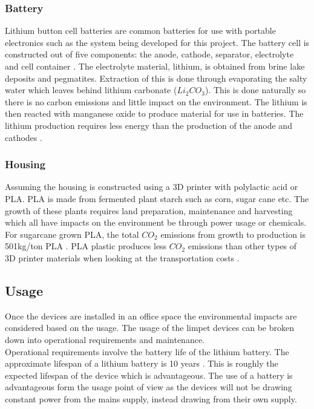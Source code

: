 \documentclass[12pt, a4paper]{article}
\begin{document}
\subsubsection{Battery}
Lithium button cell batteries are common batteries for use with portable electronics such as the system being developed for this project. The battery cell is constructed out of five components: the anode, cathode, separator, electrolyte and cell container \cite{BATTLCA_1}. The electrolyte material, lithium, is obtained from brine lake deposits and pegmatites.  Extraction of this is done through evaporating the salty water which leaves behind lithium carbonate ($Li_2CO_3$). This is done naturally so there is no carbon emissions and little impact on the environment. The lithium is then reacted with manganese oxide to produce material for use in batteries. The lithium production requires less energy than the production of the anode and cathodes \cite{BATTLCA_2}.
\subsubsection{Housing}
Assuming the housing is constructed using a 3D printer with polylactic acid or PLA. PLA is made from fermented plant starch such as corn, sugar cane etc. The growth of these plants requires land preparation, maintenance and harvesting which all have impacts on the environment be through power usage or chemicals. For sugarcane grown PLA, the total $CO_2$ emissions from growth to production is 501kg/ton PLA \cite{PLALCA_1}. PLA plastic produces less $CO_2$ emissions than other types of 3D printer materials when looking at the transportation costs \cite{PLALCA_2}.
\subsection{Usage}
Once the devices are installed in an office space the environmental impacts are considered based on the usage. The usage of the limpet devices can be broken down into operational requirements and maintenance. \\

Operational requirements involve the battery life of the lithium battery. The approximate lifespan of a lithium battery is 10 years \cite{usageLCA_1}. This is roughly the expected lifespan of the device which is advantageous. The use of a battery is advantageous form the usage point of view as the devices will not be drawing constant power from the mains supply, instead drawing from their own supply. \\
\end{document}
